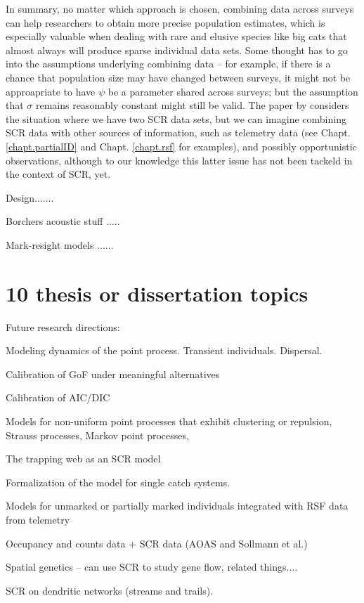 In summary, no matter which approach is chosen, combining data across surveys can help researchers to obtain more precise population estimates, which is especially valuable when dealing with rare and elusive species like big cats that almost always will produce sparse individual data sets. Some thought has to go into the assumptions underlying combining data -- for example, if there is a chance that population size may have changed between surveys, it might not be approapriate to have $\psi$ be a parameter shared across surveys; but the assumption that $\sigma$ remains reasonably constant might still be valid. The paper by \citet{gopalaswamy_etal:2012} considers the situation where we have two SCR data sets, but we can imagine combining SCR data with other sources of information, such as telemetry data (see Chapt. \ref{chapt.partialID} and Chapt. \ref{chapt.rsf} for examples), and possibly opportunistic observations, although to our knowledge this latter issue has not been tackeld in the context of SCR, yet. 


Design.......

Borchers acoustic stuff .....

Mark-resight models ......


\section{10 thesis or dissertation topics}

Future research directions:

Modeling dynamics of the point process. Transient individuals. 
Dispersal. 

Calibration of GoF under meaningful alternatives

Calibration of AIC/DIC 

Models for non-uniform point processes that exhibit clustering or
repulsion, Strauss processes, Markov point processes, 

The trapping web as an SCR model 

Formalization of the model for single catch systems. 

Models for unmarked or partially marked individuals integrated with
RSF data from telemetry

Occupancy and counts data + SCR data (AOAS and Sollmann et al.)

Spatial genetics  -- can use SCR to study gene flow, related things....

SCR on dendritic networks (streams and trails).


